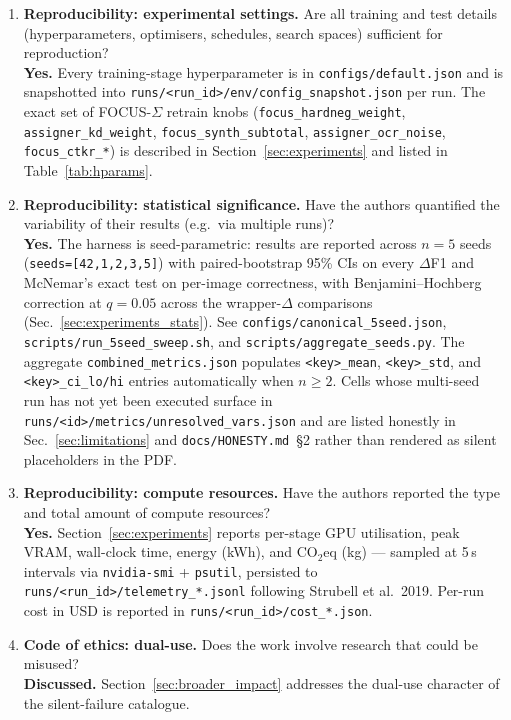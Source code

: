 \begin{enumerate}
\item \textbf{Reproducibility: experimental settings.}  Are all
training and test details (hyperparameters, optimisers, schedules,
search spaces) sufficient for reproduction?
\\\textbf{Yes.}  Every training-stage hyperparameter is in
\texttt{configs/default.json} and is snapshotted into
\texttt{runs/<run\_id>/env/config\_snapshot.json} per run.  The
exact set of FOCUS-$\Sigma$ retrain knobs
(\texttt{focus\_hardneg\_weight}, \texttt{assigner\_kd\_weight},
\texttt{focus\_synth\_subtotal}, \texttt{assigner\_ocr\_noise},
\texttt{focus\_ctkr\_*}) is described in
Section~\ref{sec:experiments} and listed in
Table~\ref{tab:hparams}.

\item \textbf{Reproducibility: statistical significance.}  Have the
authors quantified the variability of their results (e.g.\ via
multiple runs)?
\\\textbf{Yes.}  The harness is seed-parametric: results are reported
across $n=5$ seeds (\texttt{seeds=[42,1,2,3,5]}) with paired-bootstrap
95\% CIs on every $\Delta$F1 and McNemar's exact test on per-image
correctness, with Benjamini--Hochberg correction at $q=0.05$ across
the wrapper-$\Delta$ comparisons (Sec.~\ref{sec:experiments_stats}).
See \texttt{configs/canonical\_5seed.json},
\texttt{scripts/run\_5seed\_sweep.sh}, and
\texttt{scripts/aggregate\_seeds.py}.  The aggregate
\texttt{combined\_metrics.json} populates \texttt{<key>\_mean},
\texttt{<key>\_std}, and \texttt{<key>\_ci\_lo/hi} entries
automatically when $n\ge 2$.  Cells whose multi-seed run has not yet
been executed surface in
\texttt{runs/<id>/metrics/unresolved\_vars.json} and are listed
honestly in Sec.~\ref{sec:limitations} and \texttt{docs/HONESTY.md}~\S2
rather than rendered as silent placeholders in the PDF.

\item \textbf{Reproducibility: compute resources.}  Have the authors
reported the type and total amount of compute resources?
\\\textbf{Yes.}  Section~\ref{sec:experiments} reports per-stage GPU
utilisation, peak VRAM, wall-clock time, energy (kWh), and CO$_2$eq
(kg) — sampled at 5\,s intervals via \texttt{nvidia-smi} +
\texttt{psutil}, persisted to \texttt{runs/<run\_id>/telemetry\_*.jsonl}
following Strubell et al.\ 2019.  Per-run cost in USD is reported in
\texttt{runs/<run\_id>/cost\_*.json}.

\item \textbf{Code of ethics: dual-use.}  Does the work involve
research that could be misused?
\\\textbf{Discussed.}  Section~\ref{sec:broader_impact} addresses the
dual-use character of the silent-failure catalogue.


\end{enumerate}
